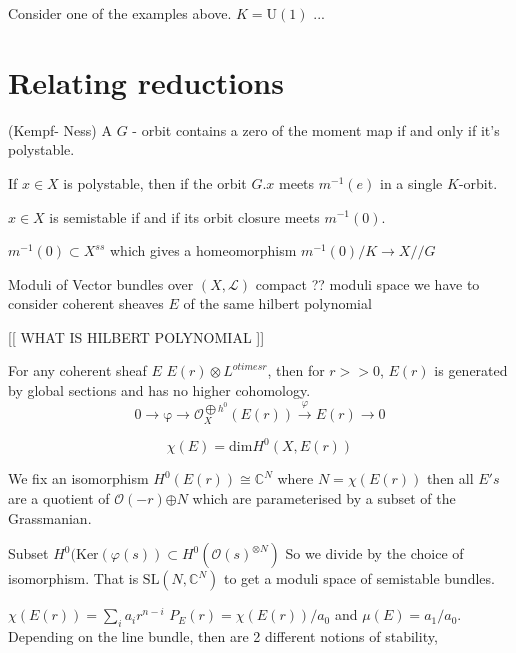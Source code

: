 Consider one of the examples above. 
$K = \mathrm{U} (1) $ ...

\section{Relating reductions} %


\begin{theorem}
 (Kempf- Ness) 
    A $ G $ - orbit contains a zero of the moment map if and only if it's polystable. 

    If $ x \in X $ is polystable, then if the orbit $ G . x $ meets $ m^{-1} (e) $ in a single $K$-orbit.

    $x \in X $ is semistable if and if its orbit closure meets $ m^{-1} (0) $. 

    $m^{-1} ( 0) \subset X ^{ss} $ which gives a homeomorphism 
    $m^{-1} (0) / K \rightarrow X//G $
\end{theorem}


Moduli of Vector bundles over $ (X, \mathcal{L} ) $
compact ?? moduli space we have to consider coherent sheaves $E$ of the same hilbert polynomial 

[[ WHAT IS HILBERT POLYNOMIAL ]] 

For any coherent sheaf $E$  $E(r) \otimes L^{otimes r} $, 
then for $ r >> 0 $, $E(r) $ is generated by global sections and has no higher cohomology. 
\begin{equation}
    0 \rightarrow \mathrm{\varphi} \rightarrow \mathcal{O} _X ^{\bigoplus h^0} (E(r)) \xrightarrow{\varphi} E(r) \rightarrow 0 
\end{equation}

\begin{equation}
    \chi(E) = \mathrm{dim} H^0 (X, E(r)) 
\end{equation}

We fix an isomorphism $H^0 (E(r) ) \cong \mathbb{C} ^N $ where $ N = \chi(E(r))$
then all $ E's $ are a quotient of $ \mathcal{O} (-r) {\oplus N } $ which are parameterised by a subset of the Grassmanian. 

Subset $ H ^0 ( \mathrm{Ker}(\varphi(s) ) \subset H^0 ( \mathcal{O} (s) ^{\otimes N} )$ 
So we divide by the choice of isomorphism. 
That is $ \mathrm{SL}(N, \mathbb{C}  ^N ) $ to get a moduli space of semistable bundles. 

$\chi ( E(r) ) = \sum _i a_i r^{n-i} $
$P_E (r) = \chi(E(r))/ a_0 $ and $\mu (E) = a_1/ a_0 $. 
Depending on the line bundle, then  are 2 different notions of stability,

